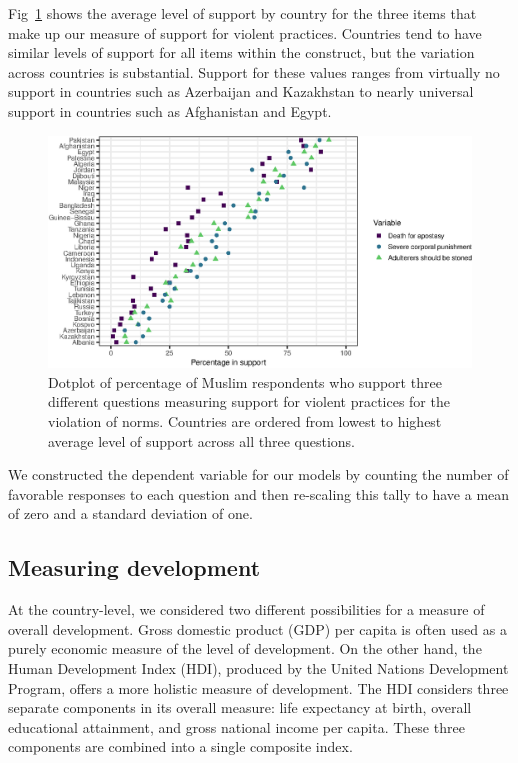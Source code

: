 \documentclass[10pt,letterpaper]{article}
\begin{document}
Fig~\ref{fig2} shows the average level of support by country for the three
items that make up our measure of support for violent practices.
Countries tend to have similar levels of support for all items within
the construct, but the variation across countries is substantial.
Support for these values ranges from virtually no support in countries
such as Azerbaijan and Kazakhstan to nearly universal support in
countries such as Afghanistan and Egypt.

\begin{figure}[!h]
\begin{adjustwidth}{-2.25in}{0in}
\centering
\includegraphics{figures/fig2.eps}
\caption{Dotplot of percentage of Muslim respondents who support three
different questions measuring support for violent practices for the
violation of norms. Countries are ordered from lowest to highest average
level of support across all three questions.}
\label{fig2}
\end{adjustwidth}
\end{figure}

We constructed the dependent variable for our models by counting the
number of favorable responses to each question and then re-scaling this
tally to have a mean of zero and a standard deviation of one.

\subsection*{Measuring development}

At the country-level, we considered two different possibilities for a
measure of overall development. Gross domestic product (GDP) per capita
is often used as a purely economic measure of the level of development.
On the other hand, the Human Development Index (HDI), produced by the
United Nations Development Program, offers a more holistic measure of
development. The HDI considers three separate components in its overall
measure: life expectancy at birth, overall educational attainment, and
gross national income per capita. These three components are combined
into a single composite index.
\end{document}
